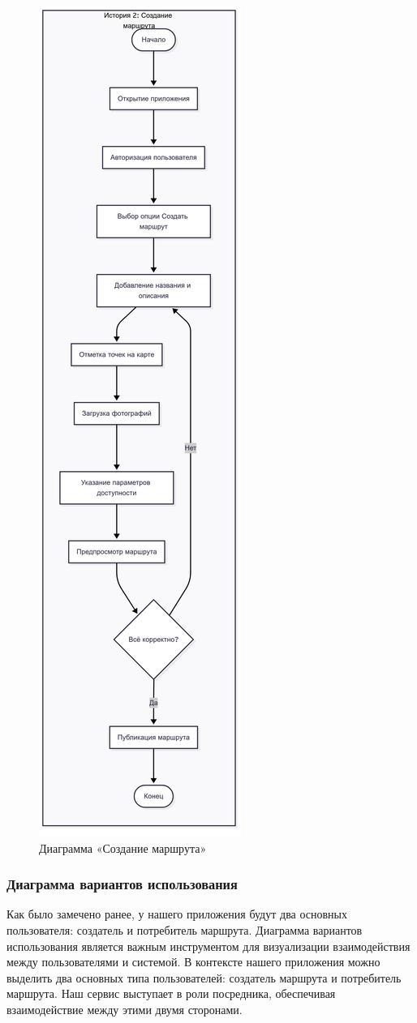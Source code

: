 \begin{itemize}
    \begin{figure}
        \centering
        \includegraphics[width=0.3\linewidth]{Images/mobile_logic/создание_маршрута-2025-04-13-180512.png}
        \caption{Диаграмма «Создание маршрута»}
        \label{fig:enter-label}
    \end{figure}
\end{itemize}

\subsubsection*{Диаграмма вариантов использования}

Как было замечено ранее, у нашего приложения будут два основных пользователя: создатель и потребитель маршрута. Диаграмма вариантов использования является важным инструментом для визуализации взаимодействия между пользователями и системой. В контексте нашего приложения можно выделить два основных типа пользователей: создатель маршрута и потребитель маршрута. Наш сервис выступает в роли посредника, обеспечивая взаимодействие между этими двумя сторонами.

